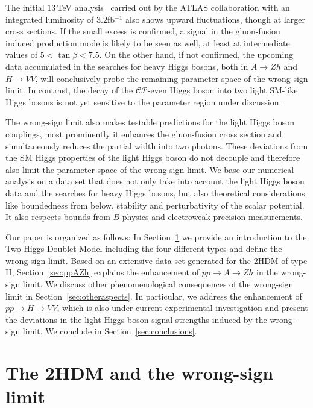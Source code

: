 \documentclass[12pt]{article}
\newcommand{\abbrev}{\scalefont{.9}}
\newcommand{\sct}[1]{Section~\ref{#1}}
\newcommand{\sm}{{\abbrev SM}}
\newcommand{\thdm}{{\abbrev 2HDM}}
\newcommand{\atlas}{{\abbrev ATLAS}}
\newcommand{\cp}{{\abbrev $\mathcal{CP}$}}
\begin{document}
The initial $13$\,TeV analysis~\cite{ATLAS-CONF-2016-015} carried out by the \atlas{} collaboration with an
integrated luminosity of $3.2$fb$^{-1}$ also shows upward fluctuations, though at larger cross sections.
If the small excess is confirmed, a signal in the gluon-fusion induced production mode is likely to be seen as
well, at least at intermediate values of $5<\tan\beta<7.5$.
On the other hand, if not confirmed, the upcoming data accumulated in the searches for heavy Higgs bosons,
both in $A\to Zh$ and $H\to VV$, will conclusively probe the remaining parameter space of the wrong-sign limit.
In contrast, the decay of the \cp{}-even Higgs boson into two light \sm{}-like Higgs bosons is not yet
sensitive to the parameter region under discussion.

The wrong-sign limit also makes testable predictions for the light Higgs boson couplings, most prominently
it enhances the gluon-fusion cross section and simultaneously reduces the partial width into two photons.
These deviations from the \sm{} Higgs properties of the light Higgs boson do not decouple and therefore also
limit the parameter space of the wrong-sign limit.
We base our numerical analysis on a data set that does not only take into account the light Higgs boson data
and the searches for heavy Higgs bosons, but also theoretical considerations like boundedness from below,
stability and perturbativity of the scalar potential.
It also respects bounds from $B$-physics and electroweak precision measurements.

Our paper is organized as follows: In \sct{sec:2hdm} we provide an introduction to the Two-Higgs-Doublet
Model including the four different types and define the wrong-sign limit.
Based on an extensive data set generated for the \thdm{} of type II, \sct{sec:ppAZh} explains the enhancement
of $pp\to A\to Zh$ in the wrong-sign limit.
We discuss other phenomenological consequences of the wrong-sign limit in \sct{sec:otheraspects}. In particular,
we address the enhancement of $pp\to H\to VV$, which is also under current experimental investigation and
present the deviations in the light Higgs boson signal strengths induced by the wrong-sign limit.
We conclude in \sct{sec:conclusions}.\\

\section{The \thdm{} and the wrong-sign limit}
\label{sec:2hdm}
\end{document}
